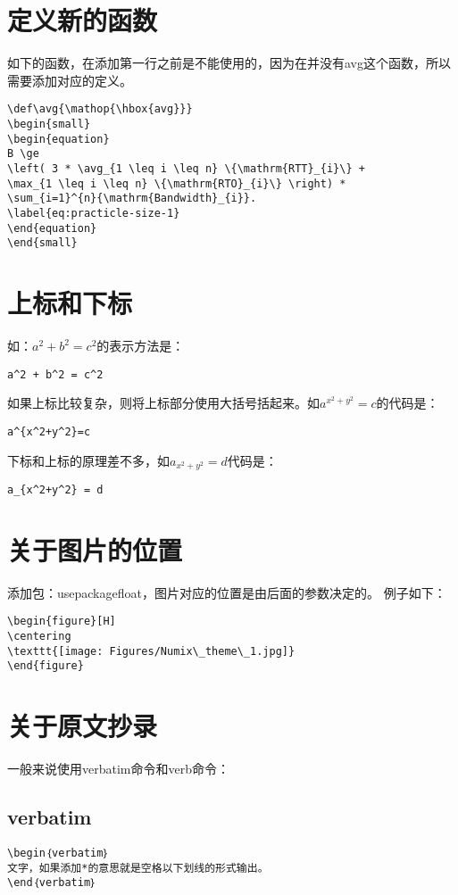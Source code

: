 \documentclass[a4paper,12pt]{ctexbook}
\begin{document}
\begin{flushleft}
\section{定义新的函数}
\label{define_function}
如下的函数，在添加第一行之前是不能使用的，因为在并没有avg这个函数，所以需要添加对应的定义。
\begin{verbatim}
\def\avg{\mathop{\hbox{avg}}}
\begin{small}
\begin{equation}
B \ge
\left( 3 * \avg_{1 \leq i \leq n} \{\mathrm{RTT}_{i}\} +
\max_{1 \leq i \leq n} \{\mathrm{RTO}_{i}\} \right) *
\sum_{i=1}^{n}{\mathrm{Bandwidth}_{i}}.
\label{eq:practicle-size-1}
\end{equation}
\end{small}
\end{verbatim}

\section{上标和下标}
\label{superscript}
如：$a^2 + b^2 = c^2$的表示方法是：
\begin{verbatim}
a^2 + b^2 = c^2
\end{verbatim}
如果上标比较复杂，则将上标部分使用大括号括起来。如$a^{x^2+y^2}=c$的代码是：
\begin{verbatim}
a^{x^2+y^2}=c
\end{verbatim}
下标和上标的原理差不多，如$a_{x^2+y^2} = d$代码是：
\begin{verbatim}
a_{x^2+y^2} = d
\end{verbatim}

\section{关于图片的位置}
\label{picture_position}
添加包：usepackage{float}，图片对应的位置是由后面的参数决定的。
例子如下：
\begin{verbatim}
\begin{figure}[H]
\centering
\texttt{[image: Figures/Numix\_theme\_1.jpg]}
\end{figure}
\end{verbatim}

\section{关于原文抄录}
\label{verbatim}
一般来说使用verbatim命令和verb命令：
\subsection{verbatim}
\begin{verbatim}
\begin｛verbatim｝
文字，如果添加*的意思就是空格以下划线的形式输出。
\end｛verbatim｝
\end{verbatim}

\end{flushleft}
\end{document}
